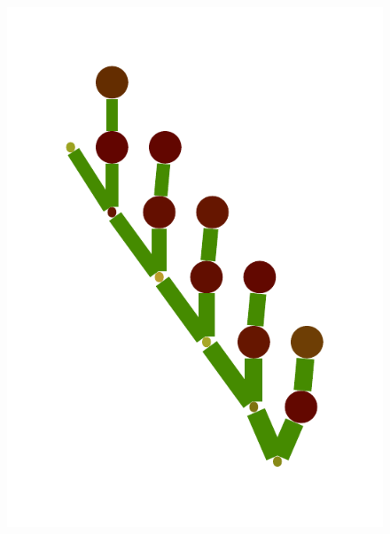 \documentclass[a4paper,10pt]{article}
\begin{document}
\begin{figure}
{    \includegraphics[scale=.14]{../figures/vector/6-4-vine-induced-8.pdf}
}
\end{figure}
\end{document}
